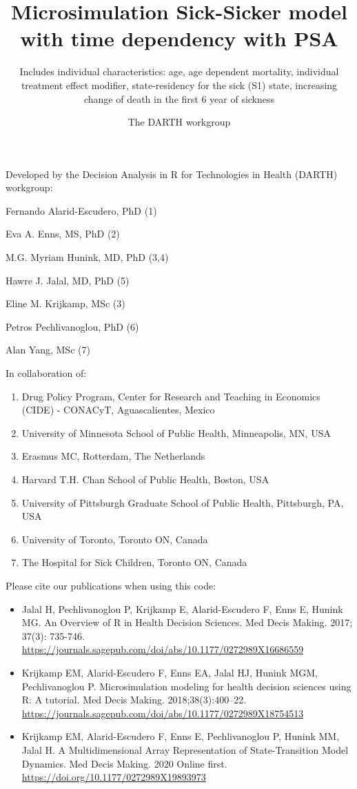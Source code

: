 \documentclass[
]{article}
\title{Microsimulation Sick-Sicker model with time dependency with PSA}
\subtitle{Includes individual characteristics: age, age dependent mortality,
individual treatment effect modifier, state-residency for the sick (S1)
state, increasing change of death in the first 6 year of sickness}
\author{The DARTH workgroup}
\date{}
\providecommand{\tightlist}{%
  \setlength{\itemsep}{0pt}\setlength{\parskip}{0pt}}
\begin{document}
\maketitle

Developed by the Decision Analysis in R for Technologies in Health
(DARTH) workgroup:

Fernando Alarid-Escudero, PhD (1)

Eva A. Enns, MS, PhD (2)

M.G. Myriam Hunink, MD, PhD (3,4)

Hawre J. Jalal, MD, PhD (5)

Eline M. Krijkamp, MSc (3)

Petros Pechlivanoglou, PhD (6)

Alan Yang, MSc (7)

In collaboration of:

\begin{enumerate}
\def\labelenumi{\arabic{enumi}.}
\tightlist
\item
  Drug Policy Program, Center for Research and Teaching in Economics
  (CIDE) - CONACyT, Aguascalientes, Mexico
\item
  University of Minnesota School of Public Health, Minneapolis, MN, USA
\item
  Erasmus MC, Rotterdam, The Netherlands
\item
  Harvard T.H. Chan School of Public Health, Boston, USA
\item
  University of Pittsburgh Graduate School of Public Health, Pittsburgh,
  PA, USA
\item
  University of Toronto, Toronto ON, Canada
\item
  The Hospital for Sick Children, Toronto ON, Canada
\end{enumerate}

Please cite our publications when using this code:

\begin{itemize}
\item
  Jalal H, Pechlivanoglou P, Krijkamp E, Alarid-Escudero F, Enns E,
  Hunink MG. An Overview of R in Health Decision Sciences. Med Decis
  Making. 2017; 37(3): 735-746.
  \url{https://journals.sagepub.com/doi/abs/10.1177/0272989X16686559}
\item
  Krijkamp EM, Alarid-Escudero F, Enns EA, Jalal HJ, Hunink MGM,
  Pechlivanoglou P. Microsimulation modeling for health decision
  sciences using R: A tutorial. Med Decis Making. 2018;38(3):400--22.
  \url{https://journals.sagepub.com/doi/abs/10.1177/0272989X18754513}
\item
  Krijkamp EM, Alarid-Escudero F, Enns E, Pechlivanoglou P, Hunink MM,
  Jalal H. A Multidimensional Array Representation of State-Transition
  Model Dynamics. Med Decis Making. 2020 Online first.
  \url{https://doi.org/10.1177/0272989X19893973}
\end{itemize}
\end{document}
